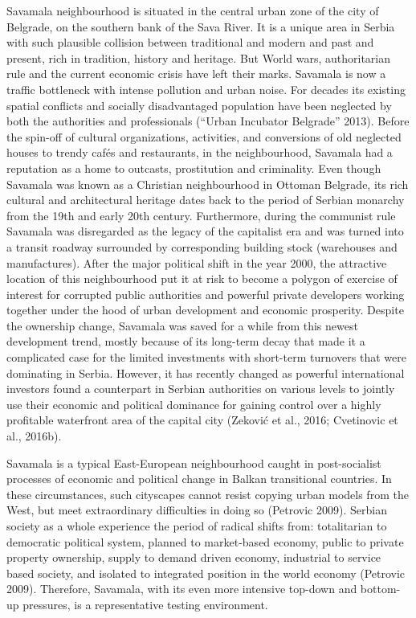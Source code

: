\documentclass[11pt]{report}
\begin{document}
Savamala neighbourhood is situated in the central urban zone of the city of Belgrade, on the southern bank of the Sava River. It is a unique area in Serbia with such plausible collision between traditional and modern and past and present, rich in tradition, history and heritage. But World wars, authoritarian rule and the current economic crisis have left their marks. Savamala is now a traffic bottleneck with intense pollution and urban noise. For decades its existing spatial conflicts and socially disadvantaged population have been neglected by both the authorities and professionals (“Urban Incubator Belgrade” 2013). Before the spin-off of cultural organizations, activities, and conversions of old neglected houses to trendy cafés and restaurants, in the neighbourhood, Savamala had a reputation as a home to outcasts, prostitution and criminality.
Even though Savamala was known as a Christian neighbourhood in Ottoman Belgrade, its rich cultural and architectural heritage dates back to the period of Serbian monarchy from the 19th and early 20th century. Furthermore, during the communist rule Savamala was disregarded as the legacy of the capitalist era and was turned into a transit roadway surrounded by corresponding building stock (warehouses and manufactures). After the major political shift in the year 2000, the attractive location of this neighbourhood put it at risk to become a polygon of exercise of interest for corrupted public authorities and powerful private developers working together under the hood of urban development and economic prosperity. Despite the ownership change, Savamala was saved for a while from this newest development trend, mostly because of its long-term decay that made it a complicated case for the limited investments with short-term turnovers that were dominating in Serbia. However, it has recently changed as powerful international investors found a counterpart in Serbian authorities on various levels to jointly use their economic and political dominance for gaining control over a highly profitable waterfront area of the capital city (Zeković et al., 2016; Cvetinovic et al., 2016b).

Savamala is a typical East-European neighbourhood caught in post-socialist processes of economic and political change in Balkan transitional countries. In these circumstances, such cityscapes cannot resist copying urban models from the West, but meet extraordinary difficulties in doing so (Petrovic 2009). Serbian society as a whole experience the period of radical shifts from: totalitarian to democratic political system, planned to market-based economy, public to private property ownership, supply to demand driven economy, industrial to service based society, and isolated to integrated position in the world economy (Petrovic 2009). Therefore, Savamala, with its even more intensive top-down and bottom-up pressures, is a representative testing environment. 
\end{document}
